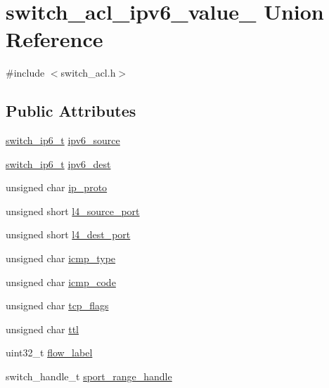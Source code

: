 \hypertarget{unionswitch__acl__ipv6__value__}{\section{switch\+\_\+acl\+\_\+ipv6\+\_\+value\+\_\+ Union Reference}
\label{unionswitch__acl__ipv6__value__}
}


{\ttfamily \#include $<$switch\+\_\+acl.\+h$>$}

\subsection*{Public Attributes}
\begin{DoxyCompactItemize}
\item 
\hyperlink{structswitch__uint128__t}{switch\+\_\+ip6\+\_\+t} \hyperlink{unionswitch__acl__ipv6__value___a3cf06a1a62ebd97d45ed22f4682ae070}{ipv6\+\_\+source}
\item 
\hyperlink{structswitch__uint128__t}{switch\+\_\+ip6\+\_\+t} \hyperlink{unionswitch__acl__ipv6__value___a78ddaa4f3d8d7fd509aa47cab612b158}{ipv6\+\_\+dest}
\item 
unsigned char \hyperlink{unionswitch__acl__ipv6__value___a5f054e913836222089458105366598d4}{ip\+\_\+proto}
\item 
unsigned short \hyperlink{unionswitch__acl__ipv6__value___a129e566a3849474b3936bfc101506cce}{l4\+\_\+source\+\_\+port}
\item 
unsigned short \hyperlink{unionswitch__acl__ipv6__value___aa123efedc79757ff60b0ff554e8fc1a3}{l4\+\_\+dest\+\_\+port}
\item 
unsigned char \hyperlink{unionswitch__acl__ipv6__value___a14db1584e48870eb442df2649fed3ec4}{icmp\+\_\+type}
\item 
unsigned char \hyperlink{unionswitch__acl__ipv6__value___ad670ffa0662f14d5438fa17f73aa1fa0}{icmp\+\_\+code}
\item 
unsigned char \hyperlink{unionswitch__acl__ipv6__value___ae3850202d3b09d3252de22f21c7b2695}{tcp\+\_\+flags}
\item 
unsigned char \hyperlink{unionswitch__acl__ipv6__value___aa3124a89a9b528df652e286da4500a7b}{ttl}
\item 
uint32\+\_\+t \hyperlink{unionswitch__acl__ipv6__value___abd9202b3360c03d783933d0321341523}{flow\+\_\+label}
\item 
switch\+\_\+handle\+\_\+t \hyperlink{unionswitch__acl__ipv6__value___ac90b3a5195c217ed92124c9c8a2ba01c}{sport\+\_\+range\+\_\+handle}

\end{DoxyCompactItemize}
